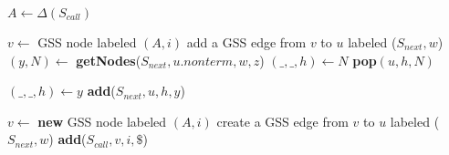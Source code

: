 \begin{algorithmic}    
    \State $A \gets \Delta(S_{call})$
    
        \State $v \gets$ GSS node labeled $(A, i)$
            \State add a GSS edge from $v$ to $u$ labeled ($S_{next},w$)
                \State $(y,N) \gets$ \textbf{getNodes}($S_{next}, u.nonterm, w, z$)
                    \State $(\_, \_, h) \gets N$
                    \State \textbf{pop}$(u,h,N)$ 
                \EndIf
                
                \State $(\_, \_, h) \gets y$
                \State \textbf{add}($S_{next} , u, h, y$)
                
            \EndFor
        \EndIf
    
    \Else
        \State $v \gets$ \textbf{new} GSS node labeled $(A, i)$
        \State create a GSS edge from $v$ to $u$ labeled ($S_{next}, w$)
        \State \textbf{add}($S_{call}, v, i, \$ $)
    \EndIf
\EndFunction
\end{algorithmic}  